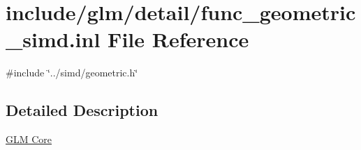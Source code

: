 \hypertarget{func__geometric__simd_8inl}{}\section{include/glm/detail/func\+\_\+geometric\+\_\+simd.inl File Reference}
\label{func__geometric__simd_8inl}
{\ttfamily \#include \char`\"{}../simd/geometric.\+h\char`\"{}}\newline


\subsection{Detailed Description}
\hyperlink{group__core}{G\+LM Core} 